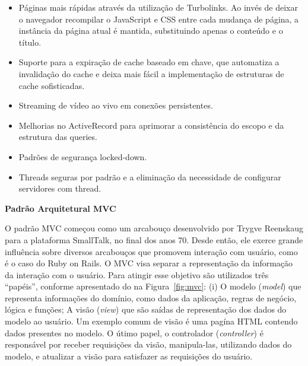 \begin{itemize}

	\item Páginas mais rápidas através da utilização de Turbolinks. Ao invés de deixar o navegador recompilar o JavaScript e CSS entre cada mudança de página, a instância da página atual é mantida, substituindo apenas o conteúdo e o título.

	\item Suporte para a expiração de cache baseado em chave, que automatiza a invalidação do cache e deixa mais fácil a implementação de estruturas de cache sofisticadas.

	\item Streaming de vídeo ao vivo em conexões persistentes.

	\item Melhorias no ActiveRecord para aprimorar a consistência do escopo e da estrutura das queries.

	\item Padrões de segurança locked-down.

	\item Threads seguras por padrão e a eliminação da necessidade de configurar servidores com thread.

\end{itemize}



\textbf{Padrão Arquitetural MVC}

O padrão MVC começou como um arcabouço desenvolvido por Trygve Reenskaug para a plataforma SmallTalk, no final dos anos 70. Desde então, ele exerce grande influência sobre diversos arcabouços que promovem interação com usuário, como é o caso do Ruby on Rails.
%
O MVC visa separar a representação da informação da interação com o usuário. Para atingir esse objetivo são utilizados três ``papéis'', conforme apresentado do na Figura~\ref{fig:mvc}:
%
(i) O modelo (\textit{model}) que representa informações do domínio, como dados
da aplicação, regras de negócio, lógica e funções;
%
A visão (\textit{view}) que são saídas de representação dos dados do modelo ao
usuário. Um exemplo comum de visão é uma pagína HTML contendo dados presentes
no modelo.
%
O útimo papel, o controlador (\textit{controller}) é responsável por receber
requisições da visão, manipula-las, utilizando dados do modelo, e atualizar a
visão para satisfazer as requisições do usuário.

